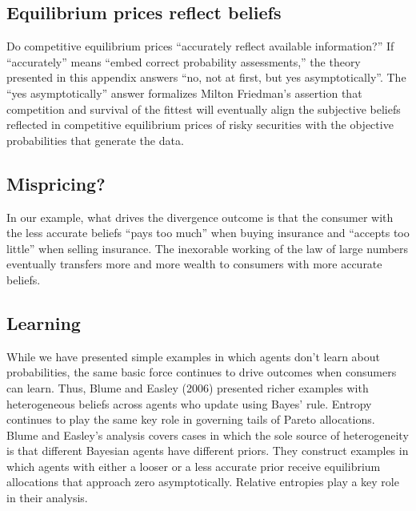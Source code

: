 




\subsection{Equilibrium prices reflect beliefs}

Do competitive equilibrium prices ``accurately reflect available information?''  If ``accurately'' means ``embed correct probability assessments,''
the theory presented in this appendix answers ``no, not at first, but yes asymptotically''.  The ``yes asymptotically'' answer formalizes
Milton Friedman's assertion that competition and survival of the fittest will eventually align the subjective beliefs reflected in competitive equilibrium prices of
risky securities with the objective probabilities that generate the data.


\subsection{Mispricing?}

In our example, what drives the divergence outcome is that the consumer with the less accurate beliefs ``pays too much'' when buying  insurance
and ``accepts too little'' when selling insurance.  The inexorable working of the law of large numbers eventually transfers more and more wealth to  consumers with  more
accurate beliefs.

\subsection{Learning}

While we have presented simple examples in which agents don't learn about probabilities, the same basic force  continues to drive outcomes
when consumers can learn.
Thus, Blume and Easley (2006) presented richer examples with heterogeneous beliefs across agents who
 update  using Bayes' rule.
   Entropy continues to play the same key role in governing  tails of Pareto allocations.
 Blume and Easley's  analysis covers cases  in which the sole source of heterogeneity is that different Bayesian
agents have different priors.  They construct examples in which    agents with either
 a looser  or a less accurate prior receive  equilibrium allocations that approach zero asymptotically. Relative entropies play a key role
 in their analysis.




